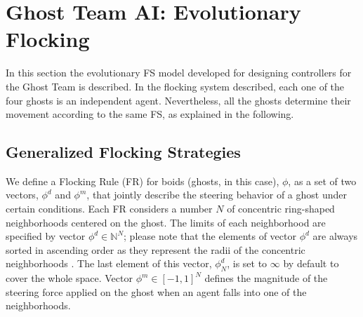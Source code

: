 \documentclass[a4paper]{llncs}
\begin{document}
%
%

\section{Ghost Team AI: Evolutionary Flocking}
\label{sec:ghosts_ai}
In this section the evolutionary FS model developed for designing controllers for the Ghost Team is described. In the flocking system described, each one of the four ghosts is an independent agent. Nevertheless, all the ghosts determine their movement according to the same FS, as explained in the following.

\subsection{Generalized Flocking Strategies}
\label{subsec:flocking_strategies}
We define a Flocking Rule (FR) for boids (ghosts, in this case), $\phi$, as a set of two vectors, $\phi^d$ and $\phi^m$, that jointly describe the steering behavior of a ghost under certain conditions. Each FR considers a number $N$ of concentric ring-shaped neighborhoods centered on the ghost. The limits of each neighborhood are specified by vector $\phi^d \in \mathbb{N}^N$; please note that the elements of vector $\phi^d$ are always sorted in ascending order as they represent the radii of the concentric neighborhoods . The last element of this vector, $\phi_N^d$, is set to $\infty$ by default to cover the whole space. Vector $\phi^m \in [-1, 1]^N$ defines the magnitude of the steering force applied on the ghost when an agent falls into one of the neighborhoods.
\end{document}
